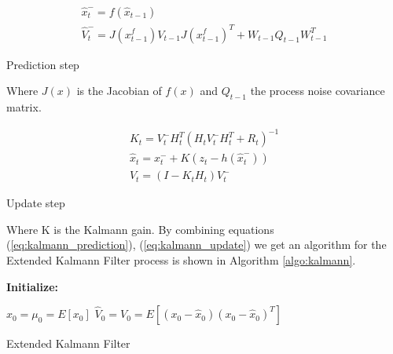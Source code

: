 \documentclass[mscthesis]{usiinfthesis}
\begin{document}
\begin{eqfloat}[H]
\begin{equation}
\begin{array}{l}
\hat{x}_t^- = f(\hat{x}_{t-1}) \\
\hat{V}_t^- = J(x^f_{t-1}) V_{t-1} J(x^f_{t-1})^T + W_{t-1} Q_{t-1} W_{t-1}^T
\end{array}
\label{eq:kalman_predict}
\end{equation}
\caption{Prediction step}
\label{eq:kalmann_prediction}
\end{eqfloat}

Where $J(x)$ is the Jacobian of $f(x)$ and $Q_{t-1}$ the process noise covariance matrix.


\begin{eqfloat}[H]
\begin{equation}
\begin{array}{l}
K_t = V_t^- H^T_t (H_t V_t^- H^T_t + R_t)^{-1} \\
\hat{x}_t = x_t^- + K (z_t - h(\hat{x}_t^-)) \\
V_t = (I-K_t H_t)V_t^-
\end{array}
\label{eq:kalman_update}
\end{equation}
\caption{Update step}
\label{eq:kalmann_update}
\end{eqfloat}

Where K is the Kalmann gain. By combining equations (\ref{eq:kalmann_prediction}), (\ref{eq:kalmann_update}) we get an algorithm for the Extended Kalmann Filter process is shown in Algorithm \ref{algo:kalmann}. 

\begin{algorithm}[H]
\textbf{Initialize: }
\begin{substeps}
$\hat{x}_0 = \mu_0 = E[x_0]$ \;
$\hat{V}_0 = V_0 = E[(x_0-\hat{x}_0)(x_0-\hat{x}_0)^T]$  \;
\end{substeps}
  \caption{Extended Kalmann Filter}
  \label{algo:kalmann}
\end{algorithm}
\end{document}
